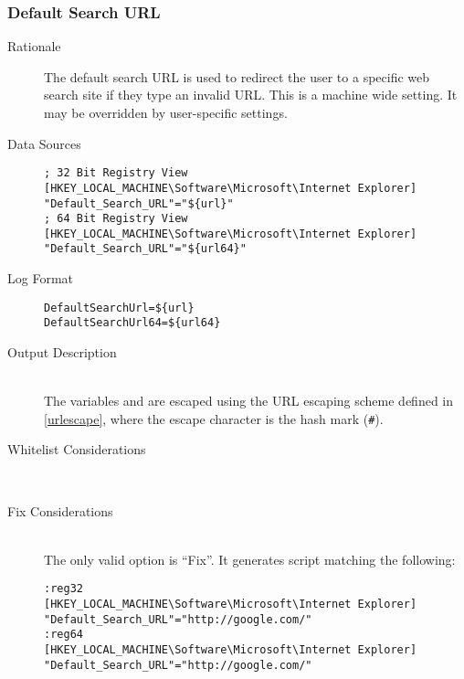 \subsubsection{Default Search URL}
\begin{description}
\item[Rationale] The default search URL is used to redirect the user to a
specific web search site if they type an invalid URL. This is a machine wide
setting.
It may be overridden by user-specific settings.

\item[Data Sources] \hfill
\vspace{-\baselineskip}
\begin{verbatim}
; 32 Bit Registry View
[HKEY_LOCAL_MACHINE\Software\Microsoft\Internet Explorer]
"Default_Search_URL"="${url}"
; 64 Bit Registry View
[HKEY_LOCAL_MACHINE\Software\Microsoft\Internet Explorer]
"Default_Search_URL"="${url64}"
\end{verbatim}
\item[Log Format] \hfill
\vspace{-\baselineskip}
\begin{verbatim} 
DefaultSearchUrl=${url}
DefaultSearchUrl64=${url64}
\end{verbatim}
\item[Output Description] \hfill \\
The variables  and  are escaped using the URL escaping
scheme defined in \ref{urlescape}, where the escape character is the hash mark
(\verb|#|).
\item[Whitelist Considerations] \hfill \\

\item[Fix Considerations] \hfill \\
The only valid option is ``Fix''. It generates script matching the following:
\vspace{-\baselineskip}
\begin{verbatim}
:reg32
[HKEY_LOCAL_MACHINE\Software\Microsoft\Internet Explorer]
"Default_Search_URL"="http://google.com/"
:reg64
[HKEY_LOCAL_MACHINE\Software\Microsoft\Internet Explorer]
"Default_Search_URL"="http://google.com/"
\end{verbatim}
\end{description}

